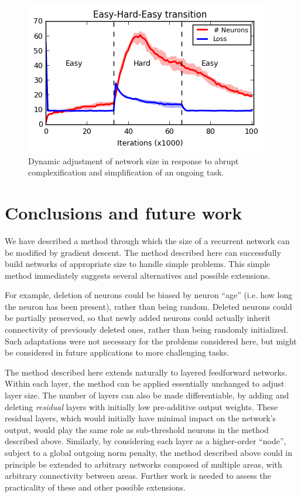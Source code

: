 \documentclass{article}
\begin{document}
\begin{figure}[b]
\label{fig:easyhardeasy}
  \centering
\includegraphics[scale=0.9]{figEHE.png}
  \caption{Dynamic adjustment of network size in response to abrupt complexification and simplification of an ongoing task.}
\end{figure}



\section{Conclusions and future work}

We have described a method through which the size of a recurrent network can be
modified by gradient descent. The method described here can successfully build
networks of appropriate size to handle simple problems. This simple method
immediately suggests several alternatives and possible extensions.

For example, deletion of neurons could be biased by neuron ``age'' (i.e. how
long the neuron has been present), rather than being random. Deleted neurons
could be partially preserved, so that newly added neurons could actually
inherit connectivity of previously deleted ones, rather than being randomly
initialized. Such adaptations were not necessary for the problems considered
here, but might be considered in future applications to more challenging tasks.

The method described here extends naturally to layered feedforward networks.
Within each layer, the method can be applied essentially unchanged to adjust
layer size. The number of layers can also be made differentiable, by adding and deleting
\textit{residual} layers \cite{He2015-gk} with initially low 
pre-additive output weights. These residual layers, which would initially have minimal impact
on the network's output, would play the same role as sub-threshold neurons in
the method described above.
 Similarly, by considering each layer as a higher-order
``node'', subject to a global outgoing norm penalty, the method described above could in
principle be extended to arbitrary networks composed of multiple areas, with
arbitrary connectivity between areas. Further work is needed to assess the
practicality of these and other possible extensions.


\small

\printbibliography
\end{document}
